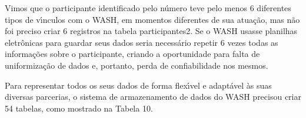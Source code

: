 \documentclass[
12pt,		%
openright,	%
twoside,  %
a4paper,			%
chapter=TITLE,		%
english,			%
french,				%
spanish,			%
brazil				%
]{USPSC-classe/USPSC}
\begin{document}
Vimos que o participante identificado pelo n\'umero  \textquotedbl  teve  pelo menos 6 diferentes tipos de v\'{\i}nculos com o WASH, em momentos diferentes de sua atua\c{c}\~ao, mas n\~ao foi preciso criar 6 registros na tabela \textquotedbl participantes2\textquotedbl . Se o WASH usasse planilhas eletr\^onicas para guardar seus dados seria necess\'ario repetir 6 vezes todas as informa\c{c}\~oes sobre o participante, criando a oportunidade para falta de uniformiza\c{c}\~ao de dados e, portanto, perda de confiabilidade nos mesmos.

















Para representar todos os seus dados de forma flex\'{\i}vel e adapt\'avel \`as suas diversas parcerias, o sistema de armazenamento de dados do WASH precisou criar 54 tabelas, como mostrado na Tabela 10.
\end{document}
